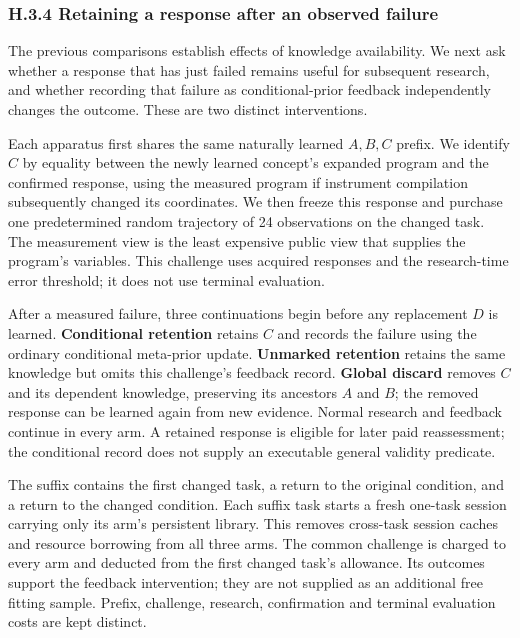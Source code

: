 \documentclass[11pt,a4paper]{article}
\begin{document}
\subsubsection*{H.3.4 Retaining a response after an observed failure}

The previous comparisons establish effects of knowledge availability. We next ask whether a response that has just failed remains useful for subsequent research, and whether recording that failure as conditional-prior feedback independently changes the outcome. These are two distinct interventions.


Each apparatus first shares the same naturally learned \(A,B,C\) prefix. We identify \(C\) by equality between the newly learned concept's expanded program and the confirmed response, using the measured program if instrument compilation subsequently changed its coordinates. We then freeze this response and purchase one predetermined random trajectory of 24 observations on the changed task. The measurement view is the least expensive public view that supplies the program's variables. This challenge uses acquired responses and the research-time error threshold; it does not use terminal evaluation.


After a measured failure, three continuations begin before any replacement \(D\) is learned. \textbf{Conditional retention} retains \(C\) and records the failure using the ordinary conditional meta-prior update. \textbf{Unmarked retention} retains the same knowledge but omits this challenge's feedback record. \textbf{Global discard} removes \(C\) and its dependent knowledge, preserving its ancestors \(A\) and \(B\); the removed response can be learned again from new evidence. Normal research and feedback continue in every arm. A retained response is eligible for later paid reassessment; the conditional record does not supply an executable general validity predicate.


The suffix contains the first changed task, a return to the original condition, and a return to the changed condition. Each suffix task starts a fresh one-task session carrying only its arm's persistent library. This removes cross-task session caches and resource borrowing from all three arms. The common challenge is charged to every arm and deducted from the first changed task's allowance. Its outcomes support the feedback intervention; they are not supplied as an additional free fitting sample. Prefix, challenge, research, confirmation and terminal evaluation costs are kept distinct.
\end{document}
